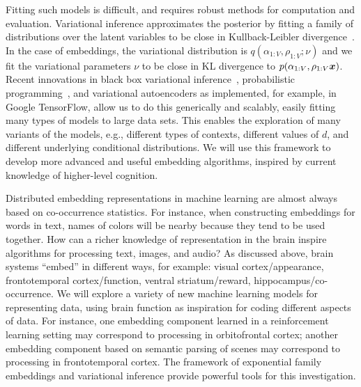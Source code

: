 Fitting such models is difficult, and requires robust methods for
computation and evaluation.  Variational inference approximates the
posterior by fitting a family of distributions over the latent
variables to be close in Kullback-Leibler
divergence~\citep{Jordan:1999,Blei:2017}.  In the case of embeddings,
the variational distribution is $q(\alpha_{1:V}, \rho_{1:V} ; \nu)$
and we fit the variational parameters $\nu$ to be close in KL
divergence to $p(\alpha_{1:V}, \rho_{1:V} \g \mbx)$.  Recent
innovations in black box variational inference~\citep{Ranganath:2014},
probabilistic programming~\citep{Kucukelbir:2017,Tran:2017}, and
variational autoencoders
\citep{kingma} as implemented, for example, in Google TensorFlow, allow us to do this generically and
scalably, easily fitting many types of models to large
data sets.  This enables the exploration of many variants of the
models, e.g., different types of contexts, different values of $d$,
and different underlying conditional distributions. We will use
this framework to develop more advanced and useful embedding
algorithms, inspired by current knowledge of higher-level cognition.


Distributed embedding representations in machine learning are almost
always based on co-occurrence statistics. For instance, when
constructing embeddings for words in text, names of colors will be nearby because they
tend to be used together. How can a richer knowledge of representation
in the brain inspire algorithms for processing text,
images, and audio? As discussed above, brain systems 
``embed'' in different ways, for example: visual cortex/appearance, frontotemporal
cortex/function, ventral striatum/reward, hippocampus/co-occurrence.
We will explore a variety of new machine learning models 
for representing data, using brain function as inspiration
for coding different aspects of data. For instance,
one embedding component learned in a reinforcement learning
setting may correspond to processing in orbitofrontal cortex;
another embedding component based on semantic parsing of scenes may correspond to processing in
frontotemporal cortex. 
The framework of exponential family embeddings and variational
inference provide powerful tools for this investigation.

